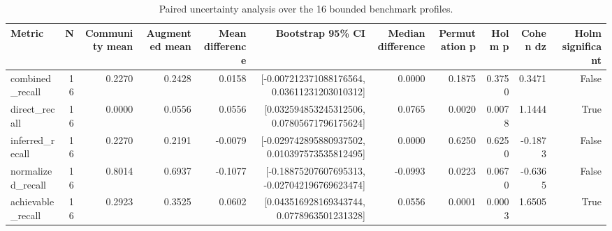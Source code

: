 \begin{table}[tb]
\centering
\caption{Paired uncertainty analysis over the 16 bounded benchmark profiles.}
\label{tab:corrected_uncertainty_summary}
\begin{tabular}{lrrrrrrrrrr}
\toprule
Metric & N & Community mean & Augmented mean & Mean difference & Bootstrap 95\% CI & Median difference & Permutation p & Holm p & Cohen dz & Holm significant \\
\midrule
combined\_recall & 16 & 0.2270 & 0.2428 & 0.0158 & [-0.007212371088176564, 0.03611231203010312] & 0.0000 & 0.1875 & 0.3750 & 0.3471 & False \\
direct\_recall & 16 & 0.0000 & 0.0556 & 0.0556 & [0.032594853245312506, 0.07805671796175624] & 0.0765 & 0.0020 & 0.0078 & 1.1444 & True \\
inferred\_recall & 16 & 0.2270 & 0.2191 & -0.0079 & [-0.029742895880937502, 0.010397573535812495] & 0.0000 & 0.6250 & 0.6250 & -0.1873 & False \\
normalized\_recall & 16 & 0.8014 & 0.6937 & -0.1077 & [-0.18875207607695313, -0.027042196769623474] & -0.0993 & 0.0223 & 0.0670 & -0.6365 & False \\
achievable\_recall & 16 & 0.2923 & 0.3525 & 0.0602 & [0.043516928169343744, 0.0778963501231328] & 0.0556 & 0.0001 & 0.0003 & 1.6505 & True \\
\bottomrule
\end{tabular}
\end{table}
